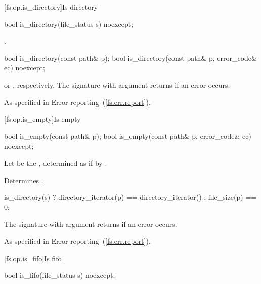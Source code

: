 [fs.op.is_directory]{Is directory}

%
\begin{itemdecl}
bool is_directory(file_status s) noexcept;
\end{itemdecl}

\begin{itemdescr}
\pnum
\returns {}.
\end{itemdescr}

%
\begin{itemdecl}
bool is_directory(const path& p);
bool is_directory(const path& p, error_code& ec) noexcept;
\end{itemdecl}

\begin{itemdescr}
\pnum
\returns {} or ,
  respectively. The signature with argument
   returns  if an error occurs.

\pnum
\throws As specified in Error reporting~(\ref{fs.err.report}).
\end{itemdescr}


[fs.op.is_empty]{Is empty}

%
\begin{itemdecl}
bool is_empty(const path& p);
bool is_empty(const path& p, error_code& ec) noexcept;
\end{itemdecl}

\begin{itemdescr}
\pnum
Let  be the , determined
as if by .

\pnum
\effects Determines .

\pnum
\returns
\begin{codeblock}
is_directory(s) ? directory_iterator(p) == directory_iterator() : file_size(p) == 0;
\end{codeblock}
The signature with argument  returns  if
  an error occurs.

\pnum
\throws As specified in Error reporting~(\ref{fs.err.report}).
\end{itemdescr}


[fs.op.is_fifo]{Is fifo}

%
\begin{itemdecl}
bool is_fifo(file_status s) noexcept;
\end{itemdecl}

